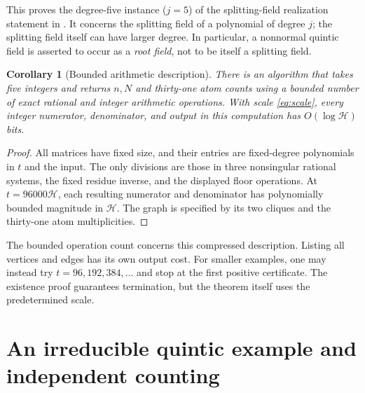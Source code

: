 \documentclass[11pt,a4paper]{article}
\newtheorem{corollary}[theorem]{Corollary}
\theoremstyle{definition}
\newcommand{\htf}{\mathcal H}
\begin{document}
This proves the degree-five instance ($j=5$) of the splitting-field
realization statement in \cite[Conjecture 7.1]{Gilmore}.
It concerns the splitting field of a polynomial of degree $j$; the
splitting field itself can have larger degree.
In particular, a nonnormal quintic field is asserted to occur as a
\emph{root field}, not to be itself a splitting field.

\begin{corollary}[Bounded arithmetic description]\label{cor:algorithm}
There is an algorithm that takes five integers and returns $n,N$ and
thirty-one atom counts using a bounded number of exact rational and
integer arithmetic operations. With scale \eqref{eq:scale}, every
integer numerator, denominator, and output in this computation has
$O(\log\htf)$ bits.
\end{corollary}
\begin{proof}
All matrices have fixed size, and their entries are fixed-degree
polynomials in $t$ and the input. The only divisions are those in three
nonsingular rational systems, the fixed residue inverse, and the
displayed floor operations. At $t=96000\htf$, each resulting numerator
and denominator has polynomially bounded magnitude in $\htf$.
The graph is specified by its two cliques and the thirty-one atom
multiplicities.
\end{proof}

The bounded operation count concerns this compressed description.
Listing all vertices and edges has its own output cost.
For smaller examples, one may instead try $t=96,192,384,\ldots$ and stop
at the first positive certificate. The existence proof guarantees
termination, but the theorem itself uses the predetermined scale.

\section{An irreducible quintic example and independent counting}
\label{sec:example}
\end{document}
